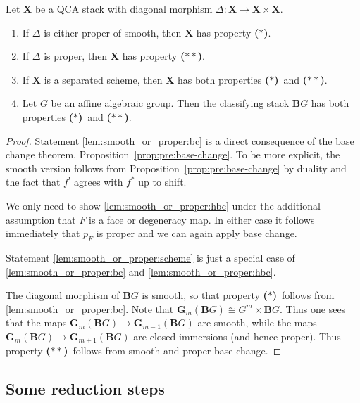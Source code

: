 \documentclass{oupau}
\theoremstyle{remark}
\let\stack\mathbf                           %
\newcommand\cs{\stack{B}}                   %
\newcommand\bc{\textbf{($\mathbf{*}$)}}
\newcommand\hbc{\textbf{($\mathbf{**}$)}}
\begin{document}
\begin{lemma}\label{lem:smooth_or_proper}
    Let $\stack X$ be a QCA stack with diagonal morphism $\Delta\colon \stack X \to \stack X \times \stack X$.
    \begin{enumerate}
        \item\label{lem:smooth_or_proper:bc} If $\Delta$ is either proper of smooth, then $\stack X$ has property \bc.
        \item\label{lem:smooth_or_proper:hbc} If $\Delta$ is proper, then $\stack X$ has property \hbc.
        \item\label{lem:smooth_or_proper:scheme} If $\stack X$ is a separated scheme, then $\stack X$ has both properties \bc\ and \hbc.
        \item\label{lem:smooth_or_proper:bg} Let $G$ be an affine algebraic group. Then the classifying stack $\cs{G}$ has both properties \bc\ and \hbc.
    \end{enumerate}
\end{lemma}

\begin{proof}
    Statement \ref{lem:smooth_or_proper:bc} is a direct consequence of the base change theorem, Proposition~\ref{prop:pre:base-change}.
    To be more explicit, the smooth version follows from Proposition~\ref{prop:pre:base-change} by duality and the fact that $f^!$ agrees with $f^*$ up to shift.

    We only need to show \ref{lem:smooth_or_proper:hbc} under the additional assumption that $F$ is a face or degeneracy map.
    In either case it follows immediately that $p_{F}$ is proper and we can again apply base change.

    Statement \ref{lem:smooth_or_proper:scheme} is just a special case of \ref{lem:smooth_or_proper:bc} and \ref{lem:smooth_or_proper:hbc}.
    
    The diagonal morphism of $\cs{G}$ is smooth, so that property \bc\ follows from \ref{lem:smooth_or_proper:bc}.
    Note that $\stack G_m(\cs{G}) \cong G^m \times \cs{G}$.
    Thus one sees that the maps $\stack G_m(\cs{G}) \to \stack G_{m-1}(\cs{G})$ are smooth, while the maps $\stack G_m(\cs{G}) \to \stack G_{m+1}(\cs{G})$ are closed immersions (and hence proper).
    Thus property \hbc\ follows from smooth and proper base change.
\end{proof}

\subsection{Some reduction steps}
\end{document}
